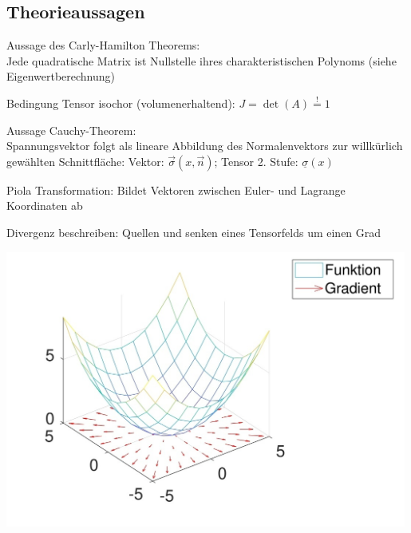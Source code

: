 \documentclass[fleqn,twoside]{article}
\begin{document}
\subsection{Theorieaussagen}
\begin{itemize}
	 \item Aussage des Carly-Hamilton Theorems:\\
	 	Jede quadratische Matrix ist Nullstelle ihres charakteristischen Polynoms (siehe Eigenwertberechnung)
	 \item Bedingung Tensor isochor (volumenerhaltend): $J = \det(A) \overset{!}{=} 1$
	 \item Aussage Cauchy-Theorem: \\
	 Spannungsvektor folgt als lineare Abbildung des Normalenvektors zur willkürlich gewählten Schnittfläche: Vektor: $\overset{\rightarrow}{\sigma}\left(x,\overset{\rightarrow}{n}\right)$; Tensor 2. Stufe: $\underline{\sigma}(x)$
        \item Piola Transformation: Bildet Vektoren zwischen Euler- und Lagrange Koordinaten ab\\
        \begin{minipage}{0.7\textwidth}
            \item Divergenz beschreiben: Quellen und senken eines Tensorfelds um einen Grad
        \end{minipage}
        \begin{minipage}{0.3\textwidth}
                \includegraphics[width=0.99\textwidth]{Grafiken/Quellen_Tensorfeld.jpg}
        \end{minipage}
\end{itemize}
\end{document}
